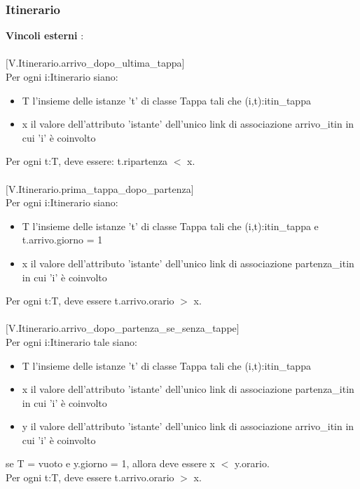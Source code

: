 \documentclass[12pt, letterpaper]{article}
\newcommand{\acc}{\\\hphantom{}\\}
\begin{document}
\subsubsection{Itinerario}
\textbf{Vincoli esterni} :\acc
$[$V.Itinerario.arrivo\_dopo\_ultima\_tappa$]$\\
\hphantom{ident}Per ogni i:Itinerario siano: \begin{itemize}
    \item  T l'insieme delle istanze 't' di classe Tappa tali che (i,t):itin\_tappa
	\item x il valore dell'attributo 'istante' dell'unico link di associazione arrivo\_itin in cui 'i' è coinvolto
\end{itemize}
\hphantom{ident}Per ogni t:T, deve essere: t.ripartenza $<$ x.\acc 
$[$V.Itinerario.prima\_tappa\_dopo\_partenza$]$\\
\hphantom{ident}Per ogni i:Itinerario siano: \begin{itemize}
		\item  T l'insieme delle istanze 't' di classe Tappa tali che (i,t):itin\_tappa e t.arrivo.giorno = 1
		\item  x il valore dell'attributo 'istante' dell'unico link di associazione partenza\_itin in cui 'i' è coinvolto
    \end{itemize}
\hphantom{ident}Per ogni t:T, deve essere t.arrivo.orario $>$ x.\acc 
$[$V.Itinerario.arrivo\_dopo\_partenza\_se\_senza\_tappe$]$\\
\hphantom{ident}Per ogni i:Itinerario tale siano:  \begin{itemize}
\item T l'insieme delle istanze 't' di classe Tappa tali che (i,t):itin\_tappa
\item x il valore dell'attributo 'istante' dell'unico link di associazione partenza\_itin in cui 'i' è coinvolto
\item y il valore dell'attributo 'istante' dell'unico link di associazione arrivo\_itin in cui 'i' è coinvolto
    
\end{itemize}
    \hphantom{ident}se T = vuoto e y.giorno = 1, allora deve essere x $<$ y.orario.\\
    \hphantom{ident}Per ogni t:T, deve essere t.arrivo.orario $>$ x.
\end{document}
